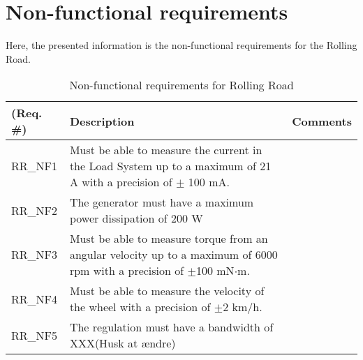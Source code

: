\section{Non-functional requirements}
Here, the presented information is the non-functional requirements for the Rolling Road.

\begin{table}[h!]
	\centering
	\begin{tabular}{|p{2 cm}|p{7 cm}|p{4 cm}|}
		\hline
		\textbf{(Req. \#)} & \textbf{Description} & \textbf{Comments} \\\hline
		RR\_NF1	& Must be able to measure the current in the Load System up to a maximum of 21 A with a precision of $\pm$ 100 mA. &   \\\hline
		RR\_NF2	& The generator must have a maximum power dissipation of 200 W &   \\\hline
		RR\_NF3	& Must be able to measure torque from an angular velocity up to a maximum of 6000 rpm with a precision of $\pm$100 mN$\cdot$m.  &   \\\hline
		RR\_NF4	& Must be able to measure the velocity of the wheel with a precision of $\pm$2 km/h. &   \\\hline
		RR\_NF5	& The regulation must have a bandwidth of XXX\fxnote (Husk at ændre) &   \\\hline
	\end{tabular}
	\label{Nonfunctional:RollingRoad}
	\caption{Non-functional requirements for Rolling Road}
\end{table}